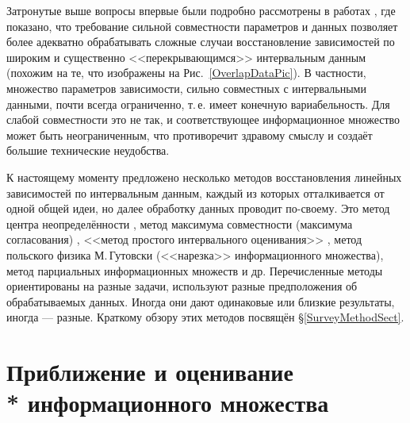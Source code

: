 \documentclass[a5paper,openany]{book}
\begin{document}
  
Затронутые выше вопросы впервые были подробно рассмотрены в работах \cite{SSharyJCT2017, 
SSharyADSAA}, где показано, что требование сильной совместности параметров и данных 
позволяет более адекватно обрабатывать сложные случаи восстановление зависимостей 
по широким и существенно <<перекрывающимся>> интервальным данным (похожим на те, 
что изображены на  Рис.~\ref{OverlapDataPic}). В частности, множество параметров 
зависимости, сильно совместных с интервальными данными, почти всегда ограниченно, 
т.\,е. имеет конечную вариабельность. Для слабой совместности это не так, и 
соответствующее информационное множество может быть неограниченным, что противоречит 
здравому смыслу и создаёт большие технические неудобства.  
  
  
К настоящему моменту предложено несколько методов восстановления линейных 
зависимостей по интервальным данным, каждый из которых отталкивается от одной общей 
идеи, но далее обработку данных проводит по-своему. Это метод центра неопределённости 
\cite{ZhilinDiss, OskorbinMaksiZhilin, Zhilin2005}, метод максимума совместности 
(максимума согласования) \cite{SShary2012, SharysJCT2013, SSharyIzvAN2017, SSharyPLab2020, 
SSharyADSAA}, <<метод простого интервального оценивания>> \cite{Rodionova}, метод 
польского физика М.\,Гутовски \cite{Gutowski} (<<нарезка>> информационного множества), 
метод парциальных информационных множеств \cite{Kumkov2010, Kumkov2013} и др. 
Перечисленные методы ориентированы на разные задачи, используют разные предположения 
об обрабатываемых данных. Иногда они дают одинаковые или близкие результаты, иногда 
--- разные. Краткому обзору этих методов посвящён \S\ref{SurveyMethodSect}. 
  
    
  
\section[Приближение и оценивание информационного множества]%
        {Приближение и оценивание \\* информационного множества} 
\label{ApprInfoSetSect} 
  
\end{document}

